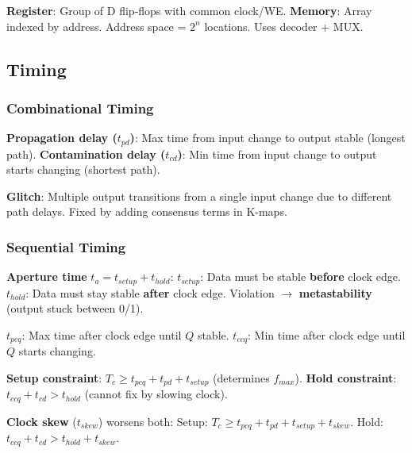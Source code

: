 \begin{definition}
	\textbf{Register}: Group of D flip-flops with common clock/WE.
	\textbf{Memory}: Array indexed by address. Address space = $2^n$ locations. Uses decoder + MUX.
\end{definition}

\subsection{Timing}

\subsubsection{Combinational Timing}

\begin{definition}
	\textbf{Propagation delay ($t_{pd}$)}: Max time from input change to output stable (longest path).
	\textbf{Contamination delay ($t_{cd}$)}: Min time from input change to output starts changing (shortest path).
\end{definition}

\begin{remark}
	\textbf{Glitch}: Multiple output transitions from a single input change due to different path delays. Fixed by adding consensus terms in K-maps.
\end{remark}

\subsubsection{Sequential Timing}

\begin{definition}
	\textbf{Aperture time} $t_a = t_{setup} + t_{hold}$:
	$t_{setup}$: Data must be stable \textbf{before} clock edge.
	$t_{hold}$: Data must stay stable \textbf{after} clock edge.
	Violation $\to$ \textbf{metastability} (output stuck between 0/1).
\end{definition}

\begin{definition}
	$t_{pcq}$: Max time after clock edge until $Q$ stable.
	$t_{ccq}$: Min time after clock edge until $Q$ starts changing.
\end{definition}

\begin{theorem}
	\textbf{Setup constraint}: $T_c \geq t_{pcq} + t_{pd} + t_{setup}$ (determines $f_{max}$).
	\textbf{Hold constraint}: $t_{ccq} + t_{cd} > t_{hold}$ (cannot fix by slowing clock).
\end{theorem}

\begin{important}
	\textbf{Clock skew} ($t_{skew}$) worsens both:
	Setup: $T_c \geq t_{pcq} + t_{pd} + t_{setup} + t_{skew}$.
	Hold: $t_{ccq} + t_{cd} > t_{hold} + t_{skew}$.
\end{important}
